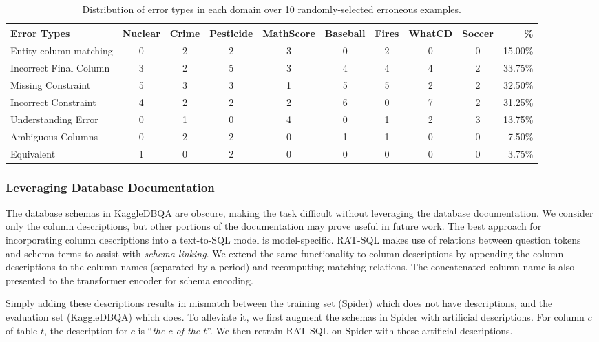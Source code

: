 \documentclass[11pt,a4paper]{article}
\newcommand{\systemname}{\mbox{KaggleDBQA}\xspace}
\begin{document}
\begin{table*}[t]
    \small
    \centering
    \caption{Distribution of error types in each domain over 10 randomly-selected erroneous examples.}
    \label{tab:error}
\begin{tabular}{lccccccccr}
        \toprule
        \textbf{Error Types}  & Nuclear & Crime & Pesticide & MathScore & Baseball & Fires & WhatCD & Soccer  & \% \\
        \midrule
        Entity-column matching & 0  & 2 & 2 & 3 & 0 & 2 & 0  & 0  &  15.00\% \\
        Incorrect Final Column & 3 & 2 & 5 & 3 & 4 & 4 & 4 & 2 & 33.75\%\\
        Missing Constraint  & 5 & 3 & 3 & 1 & 5 & 5 & 2 & 2 & 32.50\%\\
        Incorrect Constraint  & 4 & 2 & 2 & 2 & 6 & 0 & 7 & 2 & 31.25\%\\
        Understanding Error  &  0 & 1 & 0 & 4 & 0 & 1 & 2 & 3 & 13.75\% \\
        Ambiguous Columns & 0  & 2 & 2 & 0 & 1 & 1 & 0 & 0 & 7.50\%\\
        Equivalent  & 1 & 0 & 2 & 0 & 0 & 0 & 0 & 0 & 3.75\%\\
        \bottomrule
    \end{tabular}
\end{table*}

\subsubsection{Leveraging Database Documentation}
The database schemas in \systemname are obscure, making the task difficult without leveraging the database
documentation. We consider only the column descriptions, but other portions of the documentation may prove useful in
future work. The best approach for incorporating column descriptions into a text-to-SQL model is model-specific. RAT-SQL
makes use of relations between question tokens and schema terms to assist with \textit{schema-linking}. We extend the
same functionality to column descriptions by appending the column descriptions to the column names (separated by a
period) and recomputing matching relations. The concatenated column name is also presented to the transformer encoder
for schema encoding.


Simply adding these descriptions results in mismatch between the training set (Spider) which does not have
descriptions, and the evaluation set (\systemname) which does.
To alleviate it, we first augment the schemas in Spider with artificial descriptions.
For column $c$ of table $t$, the description for $c$ is ``\textit{the $c$ of the $t$}''.
We then retrain RAT-SQL on Spider with these artificial descriptions.
\end{document}
